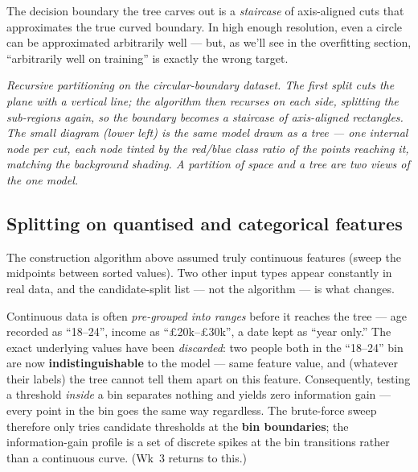 \documentclass[11pt, a4paper]{article}
\begin{document}
The decision boundary the tree carves out is a \emph{staircase} of axis-aligned cuts that approximates the true curved boundary. In high enough resolution, even a circle can be approximated arbitrarily well — but, as we'll see in the overfitting section, ``arbitrarily well on training'' is exactly the wrong target.

\begin{center}

\footnotesize\textit{Recursive partitioning on the circular-boundary dataset. The first split cuts the plane with a vertical line; the algorithm then recurses on each side, splitting the sub-regions again, so the boundary becomes a staircase of axis-aligned rectangles. The small diagram (lower left) is the same model drawn as a tree --- one internal node per cut, each node tinted by the red/blue class ratio of the points reaching it, matching the background shading. A partition of space and a tree are two views of the one model.}
\end{center}

\subsection{Splitting on quantised and categorical features}

The construction algorithm above assumed truly continuous features (sweep the midpoints between sorted values). Two other input types appear constantly in real data, and the candidate-split list — not the algorithm — is what changes.

\begin{notebox}
Continuous data is often \emph{pre-grouped into ranges} before it reaches the tree — age recorded as ``18--24'', income as ``£20k--£30k'', a date kept as ``year only.'' The exact underlying values have been \emph{discarded}: two people both in the ``18--24'' bin are now \textbf{indistinguishable} to the model — same feature value, and (whatever their labels) the tree cannot tell them apart on this feature. Consequently, testing a threshold \emph{inside} a bin separates nothing and yields zero information gain — every point in the bin goes the same way regardless. The brute-force sweep therefore only tries candidate thresholds at the \textbf{bin boundaries}; the information-gain profile is a set of discrete spikes at the bin transitions rather than a continuous curve. (Wk~3 returns to this.)
\end{notebox}
\end{document}
